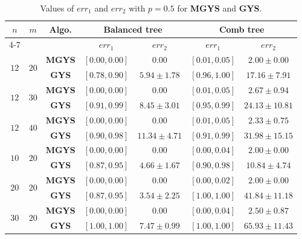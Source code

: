 \documentclass[]{article}
\begin{document}
\begin{table}[h!]
    \centering
    \caption{Values of $err_1$ and $err_2$ with $p=0.5$ for \textbf{MGYS} and \textbf{GYS}.}
    \begin{tabular}{|c|c|c||cc||cc|}
        \hline
        \multirow{2}{*}{$n$} & \multirow{2}{*}{$m$} & \multirow{2}{*}{Algo.} & \multicolumn{2}{c||}{Balanced tree} & \multicolumn{2}{c|}{Comb tree} \\
        \cline{4-7}
        & & & $err_1$ & $err_2$ & $err_1$ & $err_2$ \\
        \hline \hline
        \multirow{2}{*}{$12$} & \multirow{2}{*}{$20$} 
            & \textbf{MGYS} & $[0.00, 0.00]$ & $0.00$ & $[0.01, 0.05]$ & $2.00 \pm 0.00$ \\
        & & \textbf{GYS}  & $[0.78, 0.90]$ & $5.94 \pm 1.78$ & $[0.96, 1.00]$ & $17.16 \pm 7.91$ \\
        \hline
        \multirow{2}{*}{$12$} & \multirow{2}{*}{$30$} 
            & \textbf{MGYS} & $[0.00, 0.00]$ & $0.00$ & $[0.01, 0.05]$ & $2.67 \pm 0.94$ \\
        & & \textbf{GYS}  & $[0.91, 0.99]$ & $8.45 \pm 3.01$ & $[0.95, 0.99]$ & $24.13 \pm 10.81$ \\
        \hline
        \multirow{2}{*}{$12$} & \multirow{2}{*}{$40$} 
            & \textbf{MGYS} & $[0.00, 0.00]$ & $0.00$ & $[0.01, 0.05]$ & $2.33 \pm 0.75$ \\
        & & \textbf{GYS}  & $[0.90, 0.98]$ & $11.34 \pm 4.71$ & $[0.91, 0.99]$ & $31.98 \pm 15.15$ \\
        \hline \hline
        \multirow{2}{*}{$10$} & \multirow{2}{*}{$20$} 
            & \textbf{MGYS} & $[0.00, 0.00]$ & $0.00$ & $[0.00, 0.04]$ & $2.00 \pm 0.00$ \\
        & & \textbf{GYS}  & $[0.87, 0.95]$ & $4.66 \pm 1.67$ & $[0.90, 0.98]$ & $10.84 \pm 4.74$ \\
        \hline
        \multirow{2}{*}{$20$} & \multirow{2}{*}{$20$} 
            & \textbf{MGYS} & $[0.00, 0.00]$ & $0.00$ & $[0.00, 0.02]$ & $2.00 \pm 0.00$ \\
        & & \textbf{GYS}  & $[0.87, 0.95]$ & $3.54 \pm 2.25$ & $[1.00, 1.00]$ & $41.84 \pm 11.18$ \\
        \hline
        \multirow{2}{*}{$30$} & \multirow{2}{*}{$20$} 
            & \textbf{MGYS} & $[0.00, 0.00]$ & $0.00$ & $[0.00, 0.04]$ & $2.50 \pm 0.87$ \\
        & & \textbf{GYS}  & $[1.00, 1.00]$ & $7.47 \pm 0.99$ & $[1.00, 1.00]$ & $65.93 \pm 11.43$ \\
        \hline
    \end{tabular}
    \label{tab:m_size_fairness_GYS}
\end{table}
\end{document}
